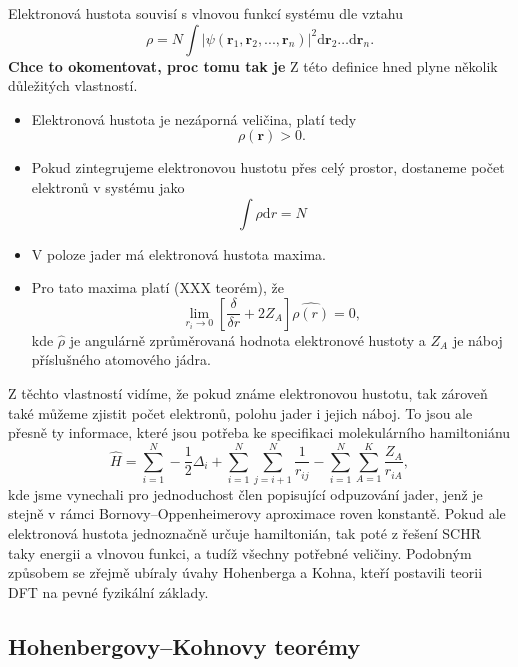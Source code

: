Elektronová hustota souvisí s vlnovou funkcí systému dle vztahu
\begin{equation}
\rho=N \int |\psi(\textbf{r}_1,\textbf{r}_2,...,\textbf{r}_n)|^2 \mathrm{d}\textbf{r}_2\dots\mathrm{d}\textbf{r}_n .
\end{equation}
\textbf{Chce to okomentovat, proc tomu tak je} Z této definice hned plyne několik důležitých vlastností.

\begin{itemize}
\item Elektronová hustota je nezáporná veličina, platí tedy
\begin{equation}
\rho(\mathbf{r})  > 0 .
\end{equation}
\item Pokud zintegrujeme elektronovou hustotu přes celý prostor, dostaneme počet elektronů v systému jako
\begin{equation}
\int \rho\mathrm{d}r = N
\end{equation}

\item V poloze jader má elektronová hustota maxima.
\item Pro tato maxima platí (XXX teorém), že
\begin{equation}
\lim_{r_i \to 0} \left[ \frac{\delta}{\delta r}+2Z_A\right]\hat{\rho(r)}=0, 
\end{equation}
kde $\hat{\rho}$ je angulárně zprůměrovaná hodnota elektronové hustoty a $Z_A$ je náboj příslušného atomového jádra.
\end{itemize}

Z těchto vlastností vidíme, že pokud známe elektronovou hustotu, tak zároveň také můžeme zjistit počet elektronů, polohu jader i jejich náboj. To jsou ale přesně ty informace, které jsou potřeba ke specifikaci molekulárního hamiltoniánu
\begin{equation}
\hat{H}=\sum_{i=1}^N -\frac{1}{2}\Delta_i+\sum_{i=1}^N\sum_{j=i+1}^N\frac{1}{r_{ij}}-\sum_{i=1}^N\sum_{A=1}^K \frac{Z_A}{r_{iA}} ,
\label{rov:ham_dft}
\end{equation}
kde jsme vynechali pro jednoduchost člen popisující odpuzování jader, jenž je stejně v rámci Bornovy--Oppenheimerovy aproximace roven konstantě. Pokud ale elektronová hustota jednoznačně určuje hamiltonián, tak poté z řešení SCHR taky energii a vlnovou funkci, a tudíž všechny potřebné veličiny. Podobným způsobem se zřejmě ubíraly úvahy Hohenberga a Kohna, kteří postavili teorii DFT na pevné fyzikální základy.

\subsection{Hohenbergovy--Kohnovy teorémy}

